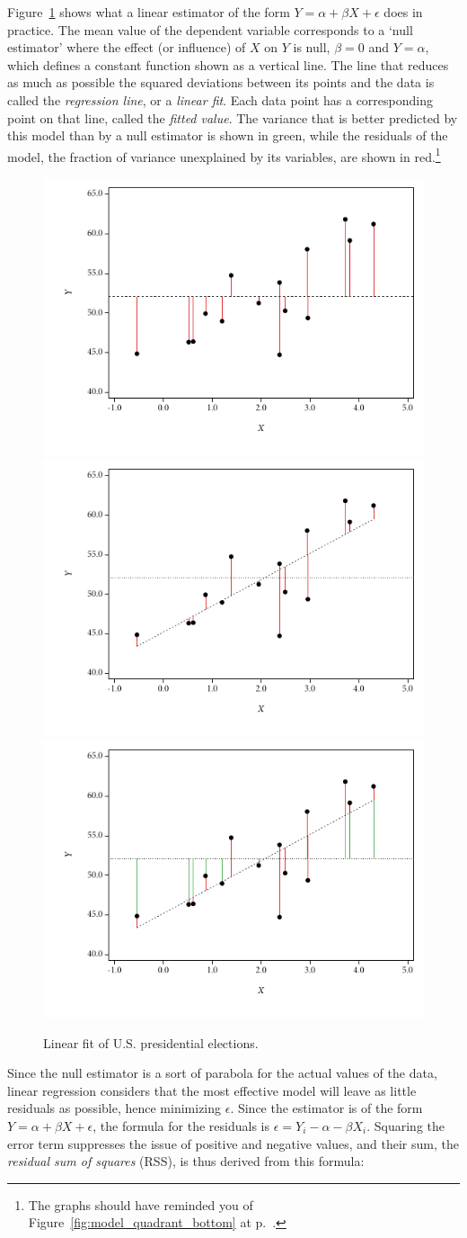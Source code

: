   Figure~\ref{fig:hibbs_fit} shows what a linear estimator of the form $Y = \alpha + \beta X + \epsilon$ does in practice. The mean value of the dependent variable corresponds to a `null estimator' where the effect (or influence) of $X$ on $Y$ is null, \ie $\beta = 0$ and $Y = \alpha$, which defines a constant function shown as a vertical line. The line that reduces as much as possible the squared deviations between its points and the data is called the \emph{regression line}, or a \emph{linear fit}. Each data point has a corresponding point on that line, called the \emph{fitted value}. The variance that is better predicted by this model than by a null estimator is shown in green, while the residuals of the model, \ie the fraction of variance unexplained by its variables, are shown in red.\footnote{The graphs should have reminded you of Figure~\ref{fig:model_quadrant_bottom} at p.~\pageref{fig:model_quadrant_bottom}.}

  \begin{figure}[htp]
  	\centering
  	\includegraphics[width=.32\textwidth]{images/hibbs2a.pdf}
  	\includegraphics[width=.32\textwidth]{images/hibbs2b.pdf}
  	\includegraphics[width=.32\textwidth]{images/hibbs2c.pdf}

  	\caption[Linear fit of U.S. presidential elections]{\label{fig:hibbs_fit}%
  	Linear fit of U.S. presidential elections. %
  	\hibbs}
  \end{figure}%

  Since the null estimator is a sort of parabola for the actual values of the data, linear regression considers that the most effective model will leave as little residuals as possible, hence minimizing $\epsilon$. Since the estimator is of the form $Y = \alpha + \beta X + \epsilon$, the formula for the residuals is $\epsilon = Y_i - \alpha - \beta X_i$. Squaring the error term suppresses the issue of positive and negative values, and their sum, the \emph{residual sum of squares} (RSS), is thus derived from this formula:

